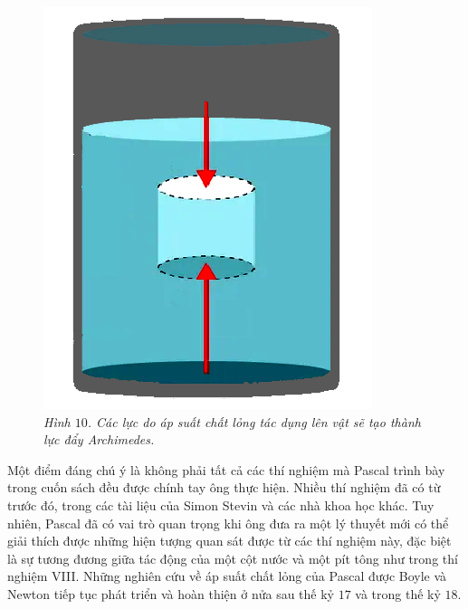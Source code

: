 \begin{multicols}{2}
	\begin{figure}[H]
		\vspace*{-5pt}
		\centering
		\captionsetup{labelformat= empty, justification=centering}
		\includegraphics[width= 0.75\linewidth]{12}
		\caption{\small\textit{\color{timhieukhoahoc}Hình $10$. Các lực do áp suất chất lỏng tác dụng lên vật sẽ tạo thành lực đẩy Archimedes.}}
		\vspace*{-10pt}
	\end{figure}
	Một điểm đáng chú ý là không phải tất cả các thí nghiệm mà Pascal trình bày trong cuốn sách đều được chính tay ông thực hiện. Nhiều thí nghiệm đã có từ trước đó, trong các tài liệu của Simon Stevin và các nhà khoa học khác. Tuy nhiên, Pascal đã có vai trò quan trọng khi ông đưa ra một lý  thuyết mới có thể giải thích được những hiện tượng quan sát được từ các thí nghiệm này, đặc biệt là sự tương đương giữa tác động của một cột nước và một pít tông như trong thí nghiệm VIII. Những nghiên cứu về áp suất chất lỏng của Pascal được Boyle và Newton tiếp tục phát triển và hoàn thiện ở nửa sau thế kỷ $17$ và trong thế kỷ $18$.
	\vskip 0.2cm
\end{multicols}
